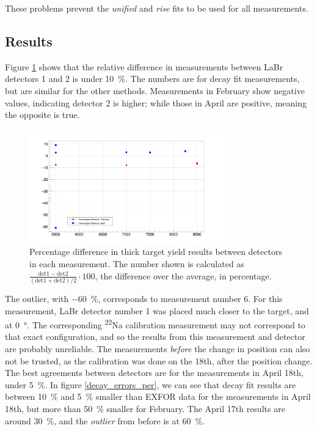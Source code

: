 \documentclass[a4paper,12pt]{report}
\newcommand{\Na}{\textsuperscript{22}Na }
\begin{document}
These problems prevent the \textit{unified} and \textit{rise} fits to be used for all measurements.
\\

\subsection{Results}
Figure \ref{decay_errors_rel_per} shows that the relative difference in measurements between LaBr detectors 1 and 2 is under \qty{10}{\percent}.
The numbers are for decay fit measurements, but are similar for the other methods.
Measurements in February show negative values, indicating detector 2 is higher; while those in April are positive, meaning the opposite is true.

\begin{figure}[H]
	\centering
	\includegraphics[width=0.75\textwidth]{decay_errors_rel_per.png}
	\caption{Percentage difference in thick target yield results between detectors in each measurement.
	The number shown is calculated as $\frac{\text{det}1-\text{det}2}{\left(\text{det}1+\text{det}2\right)/2}\cdot 100$, the difference over the average, in percentage.}
	\label{decay_errors_rel_per}
\end{figure}

The outlier, with \qty{-60}{\percent}, corresponds to measurement number 6.
For this measurement, LaBr detector number 1 was placed much closer to the target, and at \qty{0}{\degree}.
The corresponding \Na calibration measurement may not correspond to that exact configuration, and so the results from this measurement and detector are probably unreliable.
The measurements \emph{before} the change in position can also not be trusted, as the calibration was done on the 18th, after the position change.
\\

The best agreements between detectors are for the measurements in April 18th, under \qty{5}{\percent}.
In figure \ref{decay_errors_per}, we can see that decay fit results are between \qty{10}{\percent} and \qty{5}{\percent} smaller than EXFOR data for the measurements in April 18th, but more than \qty{50}{\percent} smaller for February.
The April 17th results are around \qty{30}{\percent}, and the \textit{outlier} from before is at \qty{60}{\percent}.
\end{document}
